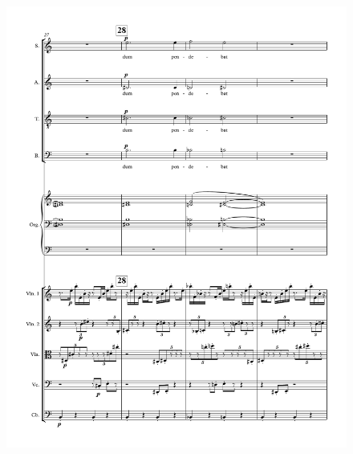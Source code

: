 \begin{figure}[htbp]
    \centering
	\includegraphics[width=6.5in]{figures/Stabat_Mater_6.pdf}
\end{figure}

